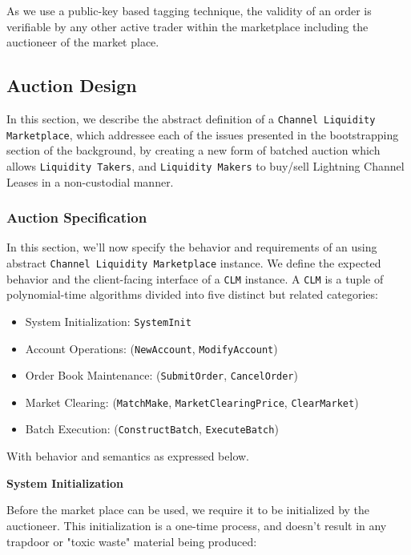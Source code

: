 \documentclass[12pt,a4paper]{article}
\theoremstyle{definition}
\begin{document}
As we use a public-key based tagging technique, the validity of an order is
verifiable by any other active trader within the marketplace including the
auctioneer of the market place.


\subsection{Auction Design}

In this section, we describe the abstract definition of a \texttt{Channel
Liquidity Marketplace}, which addressee each of the issues presented in the
bootstrapping section of the background, by creating a new form of batched
auction which allows \texttt{Liquidity Takers}, and \texttt{Liquidity Makers}
to buy/sell Lightning Channel Leases in a non-custodial manner.

\subsubsection{Auction Specification}

In this section, we'll now specify the behavior and requirements of an using abstract
\texttt{Channel Liquidity Marketplace} instance. We define the expected
behavior and the client-facing interface of a \texttt{CLM} instance. A
\texttt{CLM} is a tuple of polynomial-time algorithms divided into five
distinct but related categories:
\begin{itemize}
    \item System Initialization: \texttt{SystemInit}
    \item Account Operations: (\texttt{NewAccount}, \texttt{ModifyAccount})
    \item Order Book Maintenance: (\texttt{SubmitOrder}, \texttt{CancelOrder})
    \item Market Clearing: (\texttt{MatchMake}, \texttt{MarketClearingPrice}, \texttt{ClearMarket})
    \item Batch Execution: (\texttt{ConstructBatch}, \texttt{ExecuteBatch})
\end{itemize}


With behavior and semantics as expressed below. \\

\begin{center}
    \textbf{System Initialization}
\end{center}

Before the market place can be used, we require it to be initialized by the
auctioneer. This initialization is a one-time process, and doesn't result in
any trapdoor or "toxic waste" material being produced: \\
\end{document}
